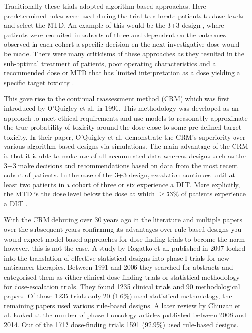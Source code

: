Traditionally these trials adopted algorithm-based approaches. Here predetermined rules were used during the trial to allocate patients to dose-levels and select the MTD. An example of this would be the 3+3 design \cite{storerDesignAnalysisPhase1989}, where patients were recruited in cohorts of three and dependent on the outcomes observed in each cohort a specific decision on the next investigative dose would be made. There were many criticisms of these approaches as they resulted in the sub-optimal treatment of patients, poor operating characteristics and a recommended dose or MTD that has limited interpretation as a dose yielding a specific target toxicity \cite{iasonosComprehensiveComparisonContinual2008, onar-thomasSimulationbasedComparisonTraditional2010}. 

This gave rise to the continual reassessment method (CRM) which was first introduced by O'Quigley et al. \cite{oquigleyContinualReassessmentMethod1990} in 1990. This methodology was developed as an approach to meet ethical requirements and use models to reasonably approximate the true probability of toxicity around the dose close to some pre-defined target toxicity. In their paper, O'Quigley et al. \cite{oquigleyContinualReassessmentMethod1990} demonstrate the CRM's superiority over various algorithm based designs via simulations. The main advantage of the CRM is that it is able to make use of all accumulated data whereas designs such as the 3+3 make decisions and recommendations based on data from the most recent cohort of patients.  In the case of the 3+3 design, escalation continues until at least two patients in a cohort of three or six experience a DLT. More explicitly, the MTD is the dose level below the dose at which $\geq$33\% of patients experience a DLT \cite{letourneauDoseEscalationMethods2009}. %

With the CRM debuting over 30 years ago in the literature and multiple papers over the subsequent years confirming its advantages over rule-based designs you would expect model-based approaches for dose-finding trials to become the norm however, this is not the case. A study by Rogatko et al. \cite{rogatkoTranslationInnovativeDesigns2007} published in 2007 looked into the translation of effective statistical designs into phase \RN{1} trials for new anticancer therapies. Between 1991 and 2006 they searched for abstracts and categorised them as either clinical dose-finding trials or statistical methodology for dose-escalation trials. They found 1235 clinical trials and 90 methodological papers. Of those 1235 trials only 20 (1.6\%) used statistical methodology, the remaining papers used various rule-based designs. A later review by Chiuzan et al. \cite{chiuzanDosefindingDesignsTrials2017} looked at the number of phase \RN{1} oncology articles published between 2008 and 2014. Out of the 1712 dose-finding trials 1591 (92.9\%) used rule-based designs. 


